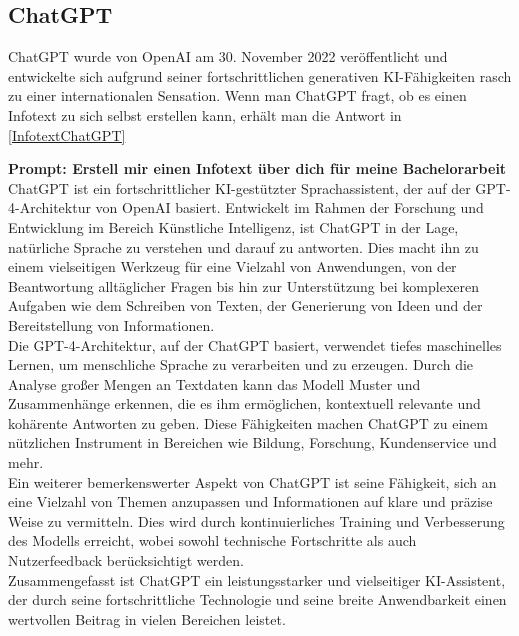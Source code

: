 \subsection{ChatGPT}  \label{ChatGPT}


ChatGPT wurde von OpenAI am 30. November 2022 veröffentlicht und entwickelte sich aufgrund seiner fortschrittlichen 
generativen KI-Fähigkeiten rasch zu einer internationalen Sensation. Wenn man ChatGPT fragt, ob es einen Infotext 
zu sich selbst erstellen kann, erhält man die Antwort in \autoref{InfotextChatGPT}

\begin{prompt} 
    \begin{tcolorbox}[colback=gray!20, colframe=gray!20, boxrule=0pt, sharp corners] 
    \textbf{Prompt: Erstell mir einen Infotext über dich für meine Bachelorarbeit}\\ 

    ChatGPT ist ein fortschrittlicher KI-gestützter Sprachassistent, der auf der GPT-4-Architektur von OpenAI basiert. 
    Entwickelt im Rahmen der Forschung und Entwicklung im Bereich Künstliche Intelligenz, ist ChatGPT in der Lage, 
    natürliche Sprache zu verstehen und darauf zu antworten. Dies macht ihn zu einem vielseitigen Werkzeug für eine 
    Vielzahl von Anwendungen, von der Beantwortung alltäglicher Fragen bis hin zur Unterstützung bei komplexeren 
    Aufgaben wie dem Schreiben von Texten, der Generierung von Ideen und der Bereitstellung von Informationen.\\
    
    Die GPT-4-Architektur, auf der ChatGPT basiert, verwendet tiefes maschinelles Lernen, um menschliche Sprache zu 
    verarbeiten und zu erzeugen. Durch die Analyse großer Mengen an Textdaten kann das Modell Muster und Zusammenhänge 
    erkennen, die es ihm ermöglichen, kontextuell relevante und kohärente Antworten zu geben. Diese Fähigkeiten machen 
    ChatGPT zu einem nützlichen Instrument in Bereichen wie Bildung, Forschung, Kundenservice und mehr.\\
    
    Ein weiterer bemerkenswerter Aspekt von ChatGPT ist seine Fähigkeit, sich an eine Vielzahl von Themen anzupassen 
    und Informationen auf klare und präzise Weise zu vermitteln. Dies wird durch kontinuierliches Training und 
    Verbesserung des Modells erreicht, wobei sowohl technische Fortschritte als auch Nutzerfeedback berücksichtigt 
    werden.\\
    
    Zusammengefasst ist ChatGPT ein leistungsstarker und vielseitiger KI-Assistent, der durch seine fortschrittliche 
    Technologie und seine breite Anwendbarkeit einen wertvollen Beitrag in vielen Bereichen leistet.\\
    \vfill
    \end{tcolorbox}
    \caption{Infotext ChatGPT, Quelle: ChatGPT}
    \label{InfotextChatGPT}
\end{prompt}

